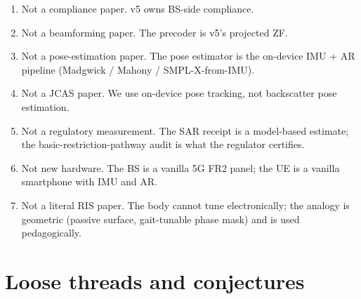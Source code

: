 \documentclass[11pt,a4paper]{article}
\theoremstyle{definition}
\begin{document}
\begin{enumerate}[leftmargin=1.6em,itemsep=3pt]
\item Not a compliance paper.  v5 owns BS-side compliance.
\item Not a beamforming paper.  The precoder is v5's projected ZF.
\item Not a pose-estimation paper.  The pose estimator is the
on-device IMU + AR pipeline (Madgwick / Mahony / SMPL-X-from-IMU).
\item Not a JCAS paper.  We use on-device pose tracking, not
backscatter pose estimation.
\item Not a regulatory measurement.  The SAR receipt is a
model-based estimate; the basic-restriction-pathway audit is what
the regulator certifies.
\item Not new hardware.  The BS is a vanilla 5G FR2 panel; the UE
is a vanilla smartphone with IMU and AR.
\item Not a literal RIS paper.  The body cannot tune electronically;
the analogy is geometric (passive surface, gait-tunable phase mask)
and is used pedagogically.
\end{enumerate}

\section{Loose threads and conjectures}\label{sec:threads}
\end{document}
